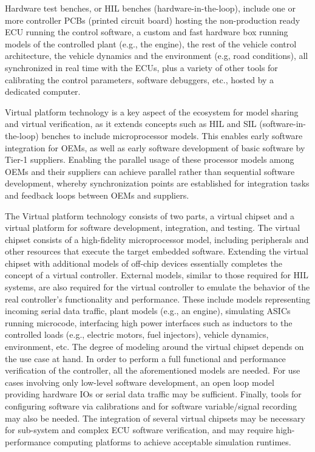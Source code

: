 Hardware test benches, or HIL benches (hardware-in-the-loop), include one or more controller PCBs (printed circuit board) hosting the non-production ready ECU running the control software, a custom and fast hardware box running models of the controlled plant (e.g., the engine), the rest of the vehicle control architecture, the vehicle dynamics and the environment (e.g, road conditions), all synchronized in real time with the ECUs, plus a variety of other tools for calibrating the control parameters, software debuggers, etc., hosted by a dedicated computer.

Virtual platform technology is a key aspect of the ecosystem for model sharing and virtual verification,
as it extends concepts such as HIL and SIL (software-in-the-loop) benches to include microprocessor models.
This enables early software integration for OEMs,
as well as early software development of basic software by Tier-1 suppliers.
Enabling the parallel usage of these processor models among OEMs and their suppliers can achieve parallel rather than sequential software development,
whereby synchronization points are established for integration tasks and feedback loops between OEMs and suppliers.

The Virtual platform technology consists of two parts, a virtual chipset and a virtual platform for software development, integration, and testing.
The virtual chipset consists of a high-fidelity microprocessor model,
including peripherals and other resources that execute the target embedded software.
Extending the virtual chipset with additional models of off-chip devices essentially %
{completes} the concept of a virtual controller.
External models, similar to those required for HIL systems, are also required for the virtual controller to emulate the behavior of the real controller's functionality and performance.
These include models representing incoming serial data traffic,
plant models (e.g., an engine), simulating ASICs running microcode, interfacing high power interfaces such as inductors to the controlled loads (e.g., electric motors, fuel injectors),
vehicle dynamics, environment, etc.
The degree of modeling around the virtual chipset depends on the use case at hand.
In order to perform a full functional and performance verification of the controller, all the aforementioned models are needed.
For use cases involving only low-level software development, an open loop model providing hardware IOs or serial data traffic may be sufficient.
Finally, tools for configuring software via calibrations and for software variable/signal recording may also be needed.
The integration of several virtual chipsets may be necessary for sub-system and complex ECU software verification, and may require high-performance computing platforms to achieve acceptable simulation runtimes.